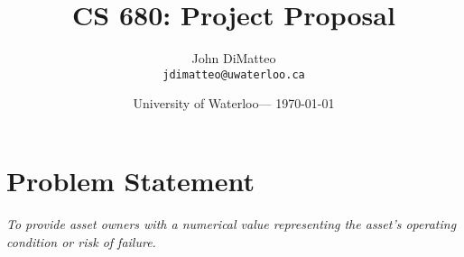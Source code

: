 \documentclass{article}
\title{CS 680: Project Proposal} %
\author{John DiMatteo\\ \texttt{jdimatteo@uwaterloo.ca}} %
\date{University of Waterloo--- \today} %
\begin{document}
\maketitle %



\newpage


\section*{Problem Statement}
\begin{center}
	\textit{
To provide asset owners with a numerical value representing the asset's operating condition or risk of failure.
	}
\end{center}









\newpage




\newpage

\end{document}
